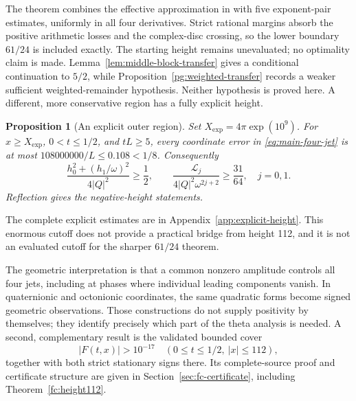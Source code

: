 \documentclass[11pt]{article}
\numberwithin{equation}{section}
\newtheorem{proposition}[theorem]{Proposition}
\theoremstyle{definition}
\theoremstyle{remark}
\newcommand{\Lag}{\mathcal L}
\begin{document}
The theorem combines the effective approximation in
\cite[Theorem 1.3]{polymath} with five exponent-pair estimates, uniformly
in all four derivatives. Strict rational margins absorb the positive
arithmetic losses and the complex-disc crossing, so the lower boundary
$61/24$ is included exactly. The starting height remains unevaluated;
no optimality claim is made. Lemma~\ref{lem:middle-block-transfer} gives
a conditional continuation to $5/2$, while
Proposition~\ref{pg:weighted-transfer} records a weaker sufficient
weighted-remainder hypothesis. Neither hypothesis is proved here.
A different, more conservative region has a fully explicit height.
\begin{proposition}[An explicit outer region]\label{prop:explicit-outer}
Set $X_{\mathrm{exp}}=4\pi\exp(10^9)$. For $x\ge X_{\mathrm{exp}}$,
$0<t\le1/2$, and $tL\ge5$, every coordinate error in
\eqref{eq:main-four-jet} is at most $108000000/L\le0.108<1/8$.
Consequently
\begin{equation}
 \frac{h_0^2+(h_1/\omega)^2}{4|Q|^2}\ge\frac12,
 \qquad
 \frac{\Lag_j}{4|Q|^2\omega^{2j+2}}\ge\frac{31}{64},\quad j=0,1.
 \label{eq:explicit-signs-intro}
\end{equation}
Reflection gives the negative-height statements.
\end{proposition}
The complete explicit estimates are in Appendix~\ref{app:explicit-height}.
This enormous cutoff does not provide a practical bridge from height 112,
and it is not an evaluated cutoff for the sharper $61/24$ theorem.

The geometric interpretation is that a common nonzero amplitude controls
all four jets, including at phases where individual leading components
vanish. In quaternionic and octonionic coordinates, the same quadratic
forms become signed geometric observations. Those constructions do not
supply positivity by themselves; they identify precisely which part of
the theta analysis is needed. A second, complementary result is the
validated bounded cover
\begin{equation}
 |F(t,x)|>10^{-17}\quad(0\le t\le1/2,\ |x|\le112),
 \label{eq:intro-bounded}
\end{equation}
together with both strict stationary signs there. Its complete-source
proof and certificate structure are given in
Section~\ref{sec:fc-certificate}, including Theorem~\ref{fc:height112}.
\end{document}
